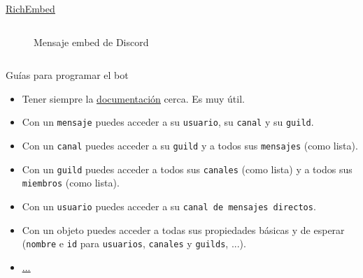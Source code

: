 \documentclass[10pt]{beamer} %
\begin{document}
\begin{frame}{\href{https://discord.js.org/\#/docs/main/stable/class/RichEmbed}{\underline{RichEmbed}}}
\begin{columns}
\begin{column}{.5\linewidth}
\begin{figure}[h]
		\caption{Mensaje embed de Discord}
		\label{fig:embed}
		\end{figure}
\end{column}
\end{columns}
\end{frame}
\begin{frame}{Guías para programar el bot}
\begin{itemize}
    \item Tener siempre la \href{https://discord.js.org/\#/docs/main/stable/general/welcome}{\underline{documentación}} cerca. Es muy útil.
    \item Con un \texttt{mensaje} puedes acceder a su \texttt{usuario}, su \texttt{canal} y su \texttt{guild}.
    \item Con un \texttt{canal} puedes acceder a su \texttt{guild} y a todos sus \texttt{mensajes} (como lista).
    \item Con un \texttt{guild} puedes acceder a todos sus \texttt{canales} (como lista) y a todos sus \texttt{miembros} (como lista).
    \item Con un \texttt{usuario} puedes acceder a su \texttt{canal de mensajes directos}.
    \item Con un objeto puedes acceder a todas sus propiedades básicas y de esperar (\texttt{nombre} e \texttt{id} para \texttt{usuarios}, \texttt{canales} y \texttt{guilds}, ...).
    \item \href{https://discord.js.org/\#/docs/main/stable/general/welcome}{\underline{...}}
\end{itemize}
\end{frame}
\end{document}
